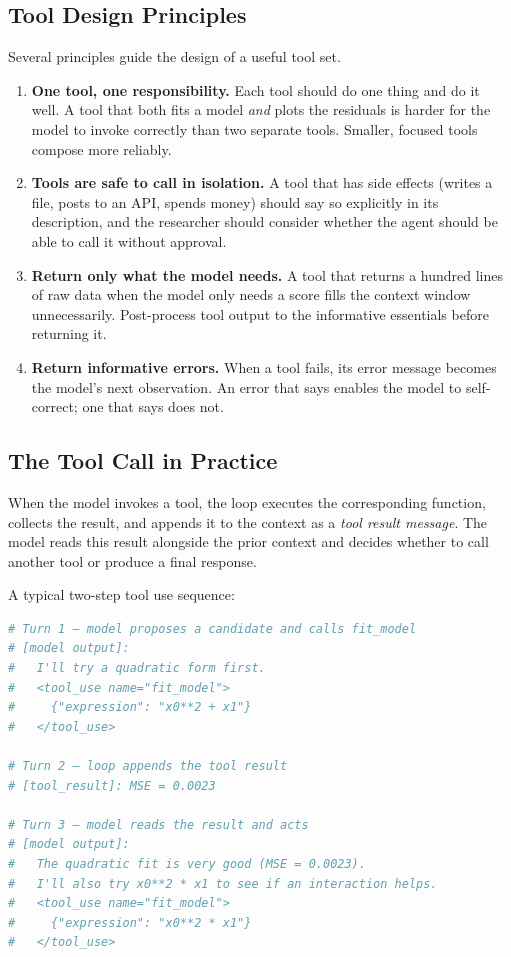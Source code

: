 \subsection{Tool Design Principles}

Several principles guide the design of a useful tool set.

\begin{enumerate}
\item \textbf{One tool, one responsibility.}
Each tool should do one thing and do it well.
A tool that both fits a model \emph{and} plots the residuals is harder for the model to invoke correctly than two separate tools.
Smaller, focused tools compose more reliably.

\item \textbf{Tools are safe to call in isolation.}
A tool that has side effects (writes a file, posts to an API, spends money) should say so explicitly in its description, and the researcher should consider whether the agent should be able to call it without approval.

\item \textbf{Return only what the model needs.}
A tool that returns a hundred lines of raw data when the model only needs a score fills the context window unnecessarily.
Post-process tool output to the informative essentials before returning it.

\item \textbf{Return informative errors.}
When a tool fails, its error message becomes the model's next observation.
An error that says  enables the model to self-correct; one that says  does not.
\end{enumerate}

\subsection{The Tool Call in Practice}

When the model invokes a tool, the loop executes the corresponding function, collects the result, and appends it to the context as a \emph{tool result message}.
The model reads this result alongside the prior context and decides whether to call another tool or produce a final response.

\begin{example}
A typical two-step tool use sequence:
\begin{lstlisting}[language=python]
# Turn 1 — model proposes a candidate and calls fit_model
# [model output]:
#   I'll try a quadratic form first.
#   <tool_use name="fit_model">
#     {"expression": "x0**2 + x1"}
#   </tool_use>

# Turn 2 — loop appends the tool result
# [tool_result]: MSE = 0.0023

# Turn 3 — model reads the result and acts
# [model output]:
#   The quadratic fit is very good (MSE = 0.0023).
#   I'll also try x0**2 * x1 to see if an interaction helps.
#   <tool_use name="fit_model">
#     {"expression": "x0**2 * x1"}
#   </tool_use>
\end{lstlisting}
\end{example}

